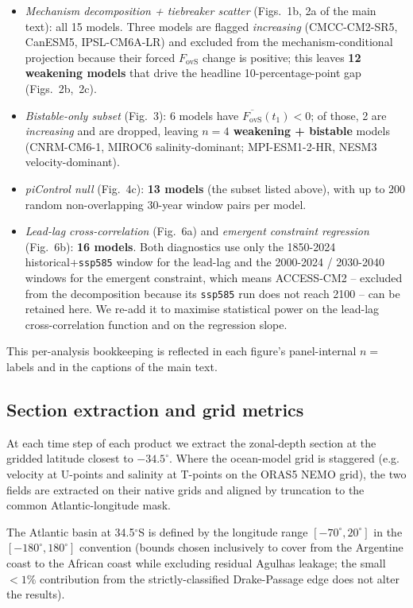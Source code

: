 \documentclass[11pt,a4paper]{article}
\newcommand{\Fovs}{F_\mathrm{ovS}}
\begin{document}
\begin{itemize}
\item \emph{Mechanism decomposition + tiebreaker scatter} (Figs.~1b, 2a of the main text): all 15 models. Three models are flagged \emph{increasing} (CMCC-CM2-SR5, CanESM5, IPSL-CM6A-LR) and excluded from the mechanism-conditional projection because their forced $\Fovs$ change is positive; this leaves \textbf{12 weakening models} that drive the headline 10-percentage-point gap (Figs.~2b,~2c).
\item \emph{Bistable-only subset} (Fig.~3): 6 models have $\overline{\Fovs}(t_1)<0$; of those, 2 are \emph{increasing} and are dropped, leaving \textbf{$n=4$ weakening + bistable} models (CNRM-CM6-1, MIROC6 salinity-dominant; MPI-ESM1-2-HR, NESM3 velocity-dominant).
\item \emph{piControl null} (Fig.~4c): \textbf{13 models} (the subset listed above), with up to 200 random non-overlapping 30-year window pairs per model.
\item \emph{Lead-lag cross-correlation} (Fig.~6a) and \emph{emergent constraint regression} (Fig.~6b): \textbf{16 models}. Both diagnostics use only the 1850-2024 historical+\texttt{ssp585} window for the lead-lag and the 2000-2024 / 2030-2040 windows for the emergent constraint, which means ACCESS-CM2 -- excluded from the decomposition because its \texttt{ssp585} run does not reach 2100 -- can be retained here. We re-add it to maximise statistical power on the lead-lag cross-correlation function and on the regression slope.
\end{itemize}

This per-analysis bookkeeping is reflected in each figure's panel-internal $n=$ labels and in the captions of the main text.

\subsection*{Section extraction and grid metrics}

At each time step of each product we extract the zonal-depth section at the gridded latitude closest to $-34.5^\circ$. Where the ocean-model grid is staggered (e.g. velocity at U-points and salinity at T-points on the ORAS5 NEMO grid), the two fields are extracted on their native grids and aligned by truncation to the common Atlantic-longitude mask.

The Atlantic basin at 34.5$^\circ$S is defined by the longitude range $[-70^\circ, 20^\circ]$ in the $[-180^\circ, 180^\circ]$ convention (bounds chosen inclusively to cover from the Argentine coast to the African coast while excluding residual Agulhas leakage; the small $<1\%$ contribution from the strictly-classified Drake-Passage edge does not alter the results).
\end{document}
